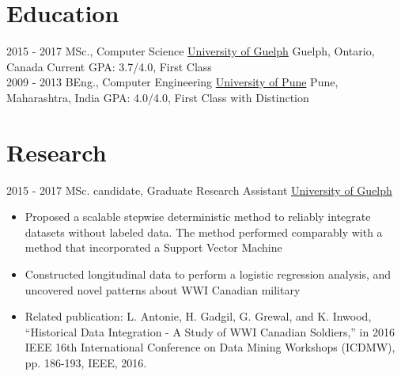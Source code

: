 \documentclass[letterpaper]{twentysecondcv} %
\begin{document}
\makeprofile %

\section{Education}

\begin{twenty} %
	\twentyitem
    	{2015 - 2017}
        {}
        {MSc., Computer Science}
        {\href{http://www.uoguelph.ca/}{University of Guelph}}
        {Guelph, Ontario, Canada}
        {Current GPA: 3.7/4.0, First Class}
    \\
	\twentyitem
    	{2009 - 2013}
		{}
        {BEng., Computer Engineering}
        {\href{http://www.unipune.ac.in/}{University of Pune}}
        {Pune, Maharashtra, India}
        {GPA: 4.0/4.0, First Class with Distinction}
\end{twenty}


\section{Research}
\begin{twenty}
	\twentyitem
    	{2015 - 2017}
		{}
        {MSc. candidate, Graduate Research Assistant}
        {\href{http://www.uoguelph.ca/}{University of Guelph}}
        {}
        {
        {\begin{itemize}
        \item Proposed a scalable stepwise deterministic method to reliably integrate datasets without labeled data. The method performed comparably with a method that incorporated a Support Vector Machine
        \item Constructed longitudinal data to perform a logistic regression analysis, and uncovered novel patterns about WWI Canadian military
		\item \textcolor{mainblue}{Related publication:} L. Antonie, H. Gadgil, G. Grewal, and K. Inwood, “Historical Data Integration - A Study of WWI Canadian Soldiers,” in 2016 IEEE 16th International Conference on Data Mining Workshops (ICDMW), pp. 186-193, IEEE, 2016.
		\end{itemize}}
        }
\end{twenty}
\end{document}
